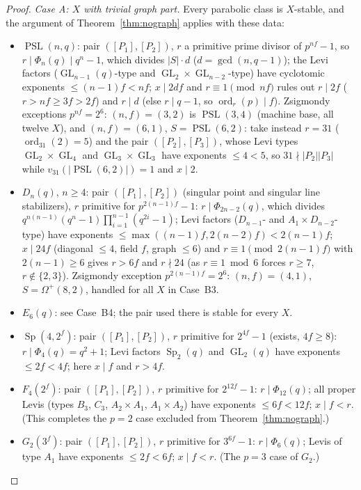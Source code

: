 \documentclass[11pt]{amsart}
\theoremstyle{definition}
\theoremstyle{remark}
\DeclareMathOperator{\PSL}{PSL}
\DeclareMathOperator{\Sp}{Sp}
\DeclareMathOperator{\GL}{GL}
\DeclareMathOperator{\ord}{ord}
\begin{document}
\begin{proof}
\emph{Case A: $X$ with trivial graph part.} Every parabolic class is
$X$-stable, and the argument of Theorem~\ref{thm:nograph} applies with
these data:
\begin{itemize}
\item $\PSL(n,q)$: pair $([P_1],[P_2])$, $r$ a primitive prime divisor
of $p^{nf}-1$, so $r\mid\Phi_n(q)\mid q^n-1$, which divides $|S|\cdot
d$ ($d=\gcd(n,q-1)$); the Levi factors ($\GL_{n-1}(q)$-type and
$\GL_2{\times}\GL_{n-2}$-type) have cyclotomic exponents
$\leq(n-1)f<nf$; $x\mid2df$ and $r\equiv1\pmod{nf}$ rules out
$r\mid2f$ ($r>nf\geq3f>2f$) and $r\mid d$ (else $r\mid q-1$, so
$\ord_r(p)\mid f$). Zsigmondy exceptions $p^{nf}=2^6$:
$(n,f)=(3,2)$ is $\PSL(3,4)$ (machine base, all twelve $X$), and
$(n,f)=(6,1)$, $S=\PSL(6,2)$: take instead $r=31$ ($\ord_{31}(2)=5$)
and the pair $([P_2],[P_3])$, whose Levi types $\GL_2{\times}\GL_4$
and $\GL_3{\times}\GL_3$ have exponents $\leq4<5$, so
$31\nmid|P_2||P_3|$ while $v_{31}(|\PSL(6,2)|)=1$ and $x\mid2$.
\item $D_n(q)$, $n\geq4$: pair $([P_1],[P_2])$ (singular point and
singular line stabilizers), $r$ primitive for $p^{2(n-1)f}-1$:
$r\mid\Phi_{2n-2}(q)$, which divides
$q^{n(n-1)}(q^n-1)\prod_{i=1}^{n-1}(q^{2i}-1)$; Levi factors
($D_{n-1}$- and $A_1{\times}D_{n-2}$-type) have exponents
$\leq\max((n-1)f,2(n-2)f)<2(n-1)f$; $x\mid24f$ (diagonal $\leq4$,
field $f$, graph $\leq6$) and $r\equiv1\pmod{2(n-1)f}$ with
$2(n-1)\geq6$ gives $r>6f$ and $r\nmid24$ (as $r\equiv1\bmod6$ forces
$r\geq7$, $r\notin\{2,3\}$). Zsigmondy exception $p^{2(n-1)f}=2^6$:
$(n,f)=(4,1)$, $S=\Omega^+(8,2)$, handled for all $X$ in Case~B3.
\item $E_6(q)$: see Case~B4; the pair used there is stable for every
$X$.
\item $\Sp(4,2^f)$: pair $([P_1],[P_2])$, $r$ primitive for $2^{4f}-1$
(exists, $4f\geq8$): $r\mid\Phi_4(q)=q^2+1$; Levi factors $\Sp_2(q)$
and $\GL_2(q)$ have exponents $\leq2f<4f$; here $x\mid f$ and $r>4f$.
\item $F_4(2^f)$: pair $([P_1],[P_2])$, $r$ primitive for $2^{12f}-1$:
$r\mid\Phi_{12}(q)$; all proper Levis (types $B_3$, $C_3$,
$A_2{\times}A_1$, $A_1{\times}A_2$) have exponents $\leq6f<12f$;
$x\mid f<r$. (This completes the $p=2$ case excluded from
Theorem~\ref{thm:nograph}.)
\item $G_2(3^f)$: pair $([P_1],[P_2])$, $r$ primitive for $3^{6f}-1$:
$r\mid\Phi_6(q)$; Levis of type $A_1$ have exponents $\leq2f<6f$;
$x\mid f<r$. (The $p=3$ case of $G_2$.)
\end{itemize}


\end{proof}
\end{document}
